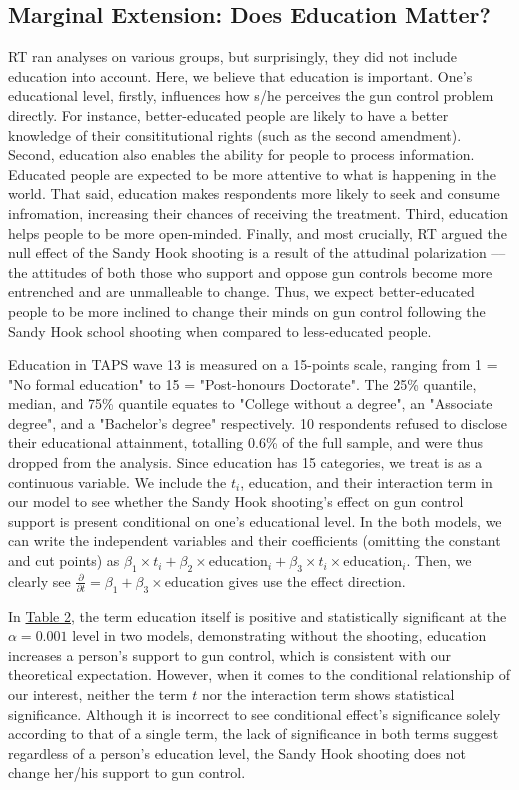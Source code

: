 \documentclass[11pt]{article}
\begin{document}
\subsection*{Marginal Extension: Does Education Matter?}
RT ran analyses on various groups, but surprisingly, they did not include education into account. Here, we believe that education is important. One’s educational level, firstly, influences how s/he perceives the gun control problem directly. For instance, better-educated people are likely to have a better knowledge of their consititutional rights (such as the second amendment). Second, education also enables the ability for people to process information. Educated people are expected to be more attentive to what is happening in the world. That said, education makes respondents more likely to seek and consume infromation, increasing their chances of receiving the treatment. Third, education helps people to be more open-minded. Finally, and most crucially, RT argued the null effect of the Sandy Hook shooting is a result of the attudinal polarization –– the attitudes of both those who support and oppose gun controls become more entrenched and are unmalleable to change. Thus, we expect better-educated people to be more inclined to change their minds on gun control following the Sandy Hook school shooting when compared to less-educated people. 

Education in TAPS wave 13 is measured on a 15-points scale, ranging from 1 = "No formal education" to 15 = "Post-honours Doctorate". The 25\% quantile, median, and 75\% quantile equates to "College without a degree", an "Associate degree", and a "Bachelor's degree" respectively. 10 respondents refused to disclose their educational attainment, totalling 0.6\% of the full sample, and were thus dropped from the analysis. Since education has 15 categories, we treat is as a continuous variable. We include the \(t_i\), education, and their interaction term in our model to see whether the Sandy Hook shooting’s effect on gun control support is present conditional on one’s educational level. In the both models, we can write the independent variables and their coefficients (omitting the constant and cut points) as \(\beta_1\times t_i + \beta_2\times \text{education}_i + \beta_3\times t_i\times\text{education}_i\). Then, we clearly see \(\frac{\partial}{\partial t} = \beta_1 + \beta_3\times \text{education}\) gives use the effect direction.

In \hyperref[tab2]{Table 2}, the term education itself is positive and statistically significant at the \(\alpha = 0.001\) level in two models, demonstrating without the shooting, education increases a person’s support to gun control, which is consistent with our theoretical expectation. However, when it comes to the conditional relationship of our interest, neither the term \(t\) nor the interaction term shows statistical significance. Although it is incorrect to see conditional effect’s significance solely according to that of a single term, the lack of significance in both terms suggest regardless of a person’s education level, the Sandy Hook shooting does not change her/his support to gun control. 

\end{document}

